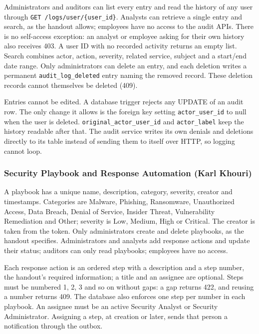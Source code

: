 Administrators and auditors can list every entry and read the history of any user through \texttt{GET /logs/user/\{user\_id\}}. Analysts can retrieve a single entry and search, as the handout allows; employees have no access to the audit APIs. There is no self-access exception: an analyst or employee asking for their own history also receives 403. A user ID with no recorded activity returns an empty list. Search combines actor, action, severity, related service, subject and a start/end date range. Only administrators can delete an entry, and each deletion writes a permanent \texttt{audit\_log\_deleted} entry naming the removed record. These deletion records cannot themselves be deleted (409).

Entries cannot be edited. A database trigger rejects any UPDATE of an audit row. The only change it allows is the foreign key setting \texttt{actor\_user\_id} to null when the user is deleted. \texttt{original\_actor\_user\_id} and \texttt{actor\_label} keep the history readable after that. The audit service writes its own denials and deletions directly to its table instead of sending them to itself over HTTP, so logging cannot loop.

\subsubsection{Security Playbook and Response Automation (Karl Khouri)}

A playbook has a unique name, description, category, severity, creator and timestamps. Categories are Malware, Phishing, Ransomware, Unauthorized Access, Data Breach, Denial of Service, Insider Threat, Vulnerability Remediation and Other; severity is Low, Medium, High or Critical. The creator is taken from the token. Only administrators create and delete playbooks, as the handout specifies. Administrators and analysts add response actions and update their status; auditors can only read playbooks; employees have no access.

Each response action is an ordered step with a description and a step number, the handout's required information; a title and an assignee are optional. Steps must be numbered 1, 2, 3 and so on without gaps: a gap returns 422, and reusing a number returns 409. The database also enforces one step per number in each playbook. An assignee must be an active Security Analyst or Security Administrator. Assigning a step, at creation or later, sends that person a notification through the outbox.

